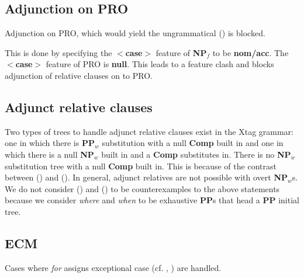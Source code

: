 


\subsection{Adjunction on PRO}
Adjunction on PRO, which would yield the ungrammatical () is blocked.

This is done by specifying the {\bf $<$case$>$} feature of {\bf NP$_{f}$} to be
{\bf nom/acc}. The {\bf $<$case$>$} feature of PRO is {\bf null}. This
leads to a feature clash and blocks adjunction of relative clauses on to
PRO.

\subsection{Adjunct relative clauses}
Two types of trees to handle adjunct relative clauses exist in the 
Xtag grammar: one in which there is {\bf PP$_{w}$} substitution with 
a null {\bf Comp} built in and one in which there is a null {\bf NP$_{w}$}
built in and a {\bf Comp} substitutes in. There is no {\bf NP$_{w}$}
substitution tree with a null {\bf Comp} built in. This is because of
the contrast between () and ().
In general, adjunct relatives are not possible with overt {\bf NP$_{w}$}s. 
We do not consider () and () to be counterexamples to 
the above statements because we consider {\em where} and {\em when}
to be exhaustive {\bf PP}s that head a {\bf PP} initial tree.


\subsection{ECM}
Cases where {\em for} assigns exceptional case (cf. , ) are handled.


